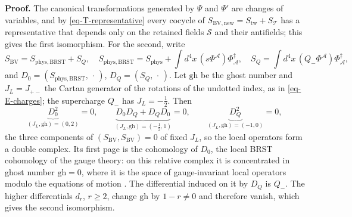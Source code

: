 \documentclass[11pt]{article}
\numberwithin{equation}{section}
\numberwithin{figure}{section}
\numberwithin{table}{section}
\begin{document}
\begin{proofbox}
\textbf{Proof.} The canonical transformations generated by $\Psi$ and $\Psi'$ are changes of variables, and by \eqref{eq-T-representative} every cocycle of $S_{\mathrm{BV,new}}=S_{\mathrm{tw}}+S_{\mathcal T}$ has a representative that depends only on the retained fields $\mathcal S$ and their antifields; this gives the first isomorphism. For the second, write
\begin{equation*}
S_{\mathrm{BV}}=S_{\mathrm{phys,BRST}}+S_Q,\quad
S_{\mathrm{phys,BRST}}=S_{\mathrm{phys}}+\int d^4x\,(s\Phi^{\mathcal A})\Phi^\ddagger_{\mathcal A},\quad
S_Q=\int d^4x\,(Q_-\Phi^{\mathcal A})\Phi^\ddagger_{\mathcal A},
\end{equation*}
and $D_0=(S_{\mathrm{phys,BRST}},\,\cdot\,)$, $D_Q=(S_Q,\,\cdot\,)$. Let $\mathrm{gh}$ be the ghost number and $J_L=J_{+-}$ the Cartan generator of the rotations of the undotted index, as in \eqref{eq-E-charges}; the supercharge $Q_-$ has $J_L=-\tfrac12$. Then
\begin{equation*}
\underbrace{D_0^2}_{(J_L,\mathrm{gh})=(0,2)}=0,\qquad
\underbrace{D_0D_Q+D_QD_0}_{(J_L,\mathrm{gh})=(-\frac12,1)}=0,\qquad
\underbrace{D_Q^2}_{(J_L,\mathrm{gh})=(-1,0)}=0,
\end{equation*}
the three components of $(S_{\mathrm{BV}},S_{\mathrm{BV}})=0$ of fixed $J_L$, so the local operators form a double complex.\footnotemark{} Its first page is the cohomology of $D_0$, the local BRST cohomology of the gauge theory: on this relative complex it is concentrated in ghost number $\mathrm{gh}=0$, where it is the space of gauge-invariant local operators modulo the equations of motion \cite{BBH}. The differential induced on it by $D_Q$ is $Q_-$. The higher differentials $d_r$, $r\ge2$, change $\mathrm{gh}$ by $1-r\ne0$ and therefore vanish, which gives the second isomorphism.~\hfill\qedsymbol
\end{proofbox}
\end{document}
